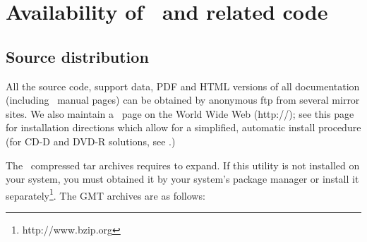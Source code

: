 %
%
\chapter{Availability of \gmt\ and related code}
\label{app:D}
\thispagestyle{headings}

\section{Source distribution}
All the source code, support data, PDF
and HTML versions of all documentation (including \UNIX\
manual pages) can be obtained by anonymous
ftp from several mirror sites.  We also maintain a \GMT\
page on the World Wide Web (http://\GMTSITE);
see this page for installation directions 
which allow for a simplified, automatic install procedure
(for CD-D and DVD-R solutions, see .)

The \GMT\ compressed tar archives requires \progname{bzip2} to expand.  If this utility
is not installed on your system, you must obtained it by your system's package manager
or install it separately\footnote{http://www.bzip.org}.
The GMT archives are as follows:

